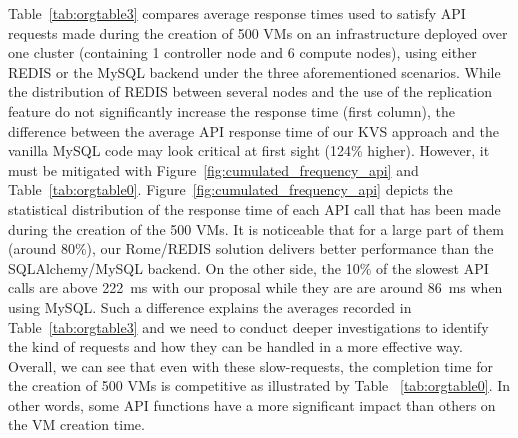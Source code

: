 Table~\ref{tab:orgtable3} compares average response times used to satisfy API
requests made during the creation of 500 VMs on an infrastructure deployed over
one cluster (containing 1 controller node and 6 compute nodes), using either
REDIS or the MySQL backend under the three aforementioned scenarios. While the
distribution of REDIS between several nodes and the use of the replication
feature do not significantly increase the response time (first column), the
difference between the average API response time of our KVS approach and the
vanilla MySQL code may look critical at first sight (124\% higher). However, it
must be mitigated with Figure~\ref{fig:cumulated_frequency_api} and
Table~\ref{tab:orgtable0}.
Figure~\ref{fig:cumulated_frequency_api} depicts the statistical distribution of
the response time of each API call that has been made during the creation of the
500 VMs. It is noticeable that for a large part of them (around 80\%), our Rome/REDIS
solution delivers better performance than the SQLAlchemy/MySQL backend.
On the other side, the 10\% of the slowest API calls are above 222~ms with our
proposal while they are are around 86~ms when using MySQL. Such a difference
explains the averages recorded in Table~\ref{tab:orgtable3} and we need to
conduct deeper investigations to identify the kind of requests and how they can
be handled in a more effective way. Overall, we can see that even with these
slow-requests, the completion time for the creation of 500 VMs is competitive as
illustrated by Table ~\ref{tab:orgtable0}. In other words, some API
functions have a more significant impact than others on the VM creation time.


